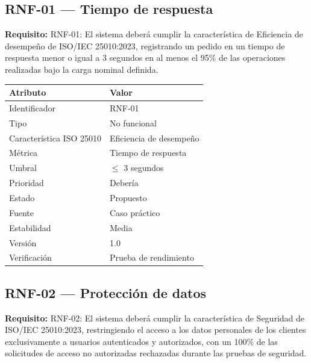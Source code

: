 \documentclass[12pt,a4paper]{article}
\begin{document}
\subsection*{RNF-01 --- Tiempo de respuesta}

\textbf{Requisito:} RNF-01: El sistema deberá cumplir la característica de Eficiencia de desempeño de ISO/IEC 25010:2023, registrando un pedido en un tiempo de respuesta menor o igual a 3 segundos en al menos el 95\% de las operaciones realizadas bajo la carga nominal definida.

\begin{center}
\begin{tabular}{ll}
\toprule
\textbf{Atributo} & \textbf{Valor} \\
\midrule
Identificador & RNF-01 \\
Tipo & No funcional \\
Característica ISO 25010 & Eficiencia de desempeño \\
Métrica & Tiempo de respuesta \\
Umbral & $\leq$ 3 segundos \\
Prioridad & Debería \\
Estado & Propuesto \\
Fuente & Caso práctico \\
Estabilidad & Media \\
Versión & 1.0 \\
Verificación & Prueba de rendimiento \\
\bottomrule
\end{tabular}
\end{center}

\subsection*{RNF-02 --- Protección de datos}

\textbf{Requisito:} RNF-02: El sistema deberá cumplir la característica de Seguridad de ISO/IEC 25010:2023, restringiendo el acceso a los datos personales de los clientes exclusivamente a usuarios autenticados y autorizados, con un 100\% de las solicitudes de acceso no autorizadas rechazadas durante las pruebas de seguridad.
\end{document}
